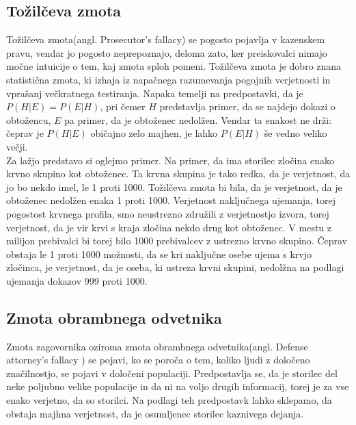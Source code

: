 \documentclass[12pt,a4paper]{amsart}
\theoremstyle{definition} %
\theoremstyle{plain} %
\begin{document}
\subsection{Tožilčeva zmota}
Tožilčeva zmota(angl. Prosecutor’s fallacy) se pogosto pojavlja v kazenskem pravu, vendar jo pogosto neprepoznajo, deloma zato, ker preiskovalci 
nimajo močne intuicije o tem, kaj zmota sploh pomeni. Tožilčeva zmota je dobro znana statistična zmota, ki izhaja iz napačnega razumevanja 
pogojnih verjetnosti in vprašanj večkratnega testiranja. Napaka temelji na predpostavki, da je $P(H \lvert E) = P(E \lvert H)$, pri čemer $H$ 
predstavlja primer, da se najdejo dokazi o obtožencu, $E$ pa primer, da je obtoženec nedolžen. Vendar ta enakost ne drži: čeprav je $P(H \lvert E)$ 
običajno zelo majhen, je lahko $P(E \lvert H)$ še vedno veliko večji. \\ 

Za lažjo predstavo si oglejmo primer. Na primer, da ima storilec zločina enako krvno skupino kot obtoženec. Ta krvna skupina je tako redka, da je 
verjetnost, da jo bo nekdo imel, le 1 proti 1000. Tožilčeva zmota bi bila, da je verjetnost, da je obtoženec nedolžen enaka 1 proti 1000. Verjetnost
naključnega ujemanja, torej pogostost krvnega profila, smo neustrezno združili z verjetnostjo izvora, torej verjetnost, da je vir krvi s kraja zločina 
nekdo drug kot obtoženec. V mestu z milijon prebivalci bi torej bilo 1000 prebivalcev z ustrezno krvno skupino. Čeprav obstaja le 1 proti 1000 možnosti, 
da se kri naključne osebe ujema s krvjo zločinca, je verjetnost, da je oseba, ki ustreza krvni skupini, nedolžna na podlagi ujemanja dokazov 999 proti 1000.

\subsection{Zmota obrambnega odvetnika}
Zmota zagovornika oziroma zmota obrambnega odvetnika(angl. Defense attorney's fallacy ) se pojavi, ko se poroča o tem, koliko ljudi z 
določeno značilnostjo, se pojavi v določeni populaciji. Predpostavlja se, da je storilec del neke poljubno velike populacije in da ni na voljo 
drugih informacij, torej je za vse enako verjetno, da so storilci. Na podlagi teh predpostavk lahko sklepamo, da obstaja majhna verjetnost, 
da je osumljenec storilec kaznivega dejanja. \\
\end{document}
